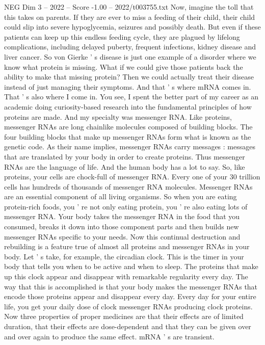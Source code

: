 \begin{textsample}{NEG Dim 3 – 2022 – Score -1.00 – 2022/t003755.txt}
Now, imagine the toll that this takes on parents.
If they are ever to miss a feeding of their child, their child could slip into severe hypoglycemia, seizures and possibly death.
But even if these patients can keep up this endless feeding cycle, they are plagued by lifelong complications, including delayed puberty, frequent infections, kidney disease and liver cancer.
So von Gierke ' s disease is just one example of a disorder where we know what protein is missing.
What if we could give those patients back the ability to make that missing protein?
Then we could actually treat their disease instead of just managing their symptoms.
And that ' s where mRNA comes in.
That ' s also where I come in.
You see, I spent the better part of my career as an academic doing curiosity-based research into the fundamental principles of how proteins are made.
And my specialty was messenger RNA.
Like proteins, messenger RNAs are long chainlike molecules composed of building blocks.
The four building blocks that make up messenger RNAs form what is known as the genetic code.
As their name implies, messenger RNAs carry messages : messages that are translated by your body in order to create proteins.
Thus messenger RNAs are the language of life.
And the human body has a lot to say.
So, like proteins, your cells are chock-full of messenger RNA.
Every one of your 30 trillion cells has hundreds of thousands of messenger RNA molecules.
Messenger RNAs are an essential component of all living organisms.
So when you are eating protein-rich foods, you ' re not only eating protein, you ' re also eating lots of messenger RNA.
Your body takes the messenger RNA in the food that you consumed, breaks it down into those component parts and then builds new messenger RNAs specific to your needs.
Now this continual destruction and rebuilding is a feature true of almost all proteins and messenger RNAs in your body.
Let ' s take, for example, the circadian clock.
This is the timer in your body that tells you when to be active and when to sleep.
The proteins that make up this clock appear and disappear with remarkable regularity every day.
The way that this is accomplished is that your body makes the messenger RNAs that encode those proteins appear and disappear every day.
Every day for your entire life, you get your daily dose of clock messenger RNAs producing clock proteins.
Now three properties of proper medicines are that their effects are of limited duration, that their effects are dose-dependent and that they can be given over and over again to produce the same effect. mRNA ' s are transient.

\end{textsample}
